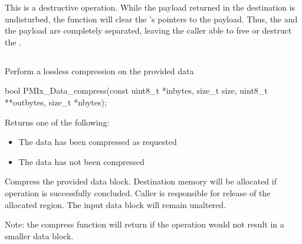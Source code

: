 \adviceuserstart
This is a destructive operation. While the payload returned in the
destination  is
undisturbed, the function will clear the 's pointers to the
payload. Thus, the  and the payload are completely separated,
leaving the caller able to free or destruct the .
\adviceuserend



\subsection{}

\summary

Perform a lossless compression on the provided data

\format

\cspecificstart
\begin{codepar}
bool
PMIx_Data_compress(const uint8_t *inbytes, size_t size,
                   uint8_t **outbytes, size_t *nbytes);
\end{codepar}
\cspecificend

\begin{arglist}
\end{arglist}

Returns one of the following:
\begin{itemize}
\item {} The data has been compressed as requested
\item {} The data has not been compressed
\end{itemize}

\descr

Compress the provided data block. Destination memory
will be allocated if operation is successfully concluded. Caller
is responsible for release of the allocated region. The input
data block will remain unaltered.

Note: the compress function will return  if the operation
would not result in a smaller data block.



